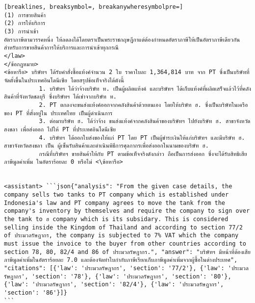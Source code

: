 \begin{Verbatim}[breaklines, breaksymbol=, breakanywheresymbolpre=]
(1) การขายสินค้า
(2) การให้บริการ
(3) การนำเข้า
อัตราภาษีตามวรรคหนึ่ง ให้ลดลงได้โดยตราเป็นพระราชกฤษฎีกาแต่ต้องกำหนดอัตราภาษีให้เป็นอัตราภาษีเดียวกันสำหรับการขายสินค้าการให้บริการและการนำเข้าทุกกรณี
</law>
</ข้อกฎหมาย>
<ข้อหารือ> บริษัทฯ ได้รับคำสั่งซื้อแท้งค์จำนวน 2 ใบ ราคาใบละ 1,364,814 บาท จาก PT ซึ่งเป็นบริษัทที่จัดตั้งขึ้นในประเทศอินโดนีเซีย โดยสรุปข้อเท็จจริงได้ดังนี้
          1. บริษัทฯ ได้ว่าจ้างบริษัท ท. เป็นผู้ผลิตแท้งค์ และบริษัทฯ ได้เก็บแท้งค์ที่ผลิตเสร็จแล้วไว้ที่คลังสินค้าที่จังหวัดชลบุรี ซึ่งบริษัทฯ ได้เช่าจากบริษัท ท.
          2. PT ตกลงจะขนส่งแท้งค์ออกจากคลังสินค้าด้วยตนเอง โดยให้บริษัท ฮ. ซึ่งเป็นบริษัทในเครือของ PT ที่ตั้งอยู่ใน ประเทศไทย เป็นผู้ดำเนินการ
          3. ต่อมาบริษัท ฮ. ได้ว่าจ้าง ขนส่งแท้งค์จากคลังสินค้าของบริษัทฯ ไปยังบริษัท ฮ. สาขาจังหวัดสงขลา เพื่อส่งออก ไปให้ PT ที่ประเทศอินโดนีเซีย
          4. บริษัทฯ ได้ออกใบส่งของให้แก่ PT โดย PT เป็นผู้ชำระเงินให้แก่บริษัทฯ และมีบริษัท ฮ. สาขาจังหวัดสงขลา เป็น ผู้เซ็นรับสินค้าและดำเนินพิธีการศุลกากรเพื่อส่งออกในนามของบริษัท ฮ.
          กรณีที่บริษัทฯ ขายสินค้าให้กับ PT ตามข้อเท็จจริงดังกล่าว ถือเป็นการส่งออก ซึ่งจะได้รับสิทธิเสียภาษีมูลค่าเพิ่ม ในอัตราร้อยละ 0 หรือไม่ <\ข้อหารือ>


<assistant> ```json{"analysis": "From the given case details, the company sells two tanks to PT company which is established under Indonesia's law and PT company agrees to move the tank from the company's inventory by themselves and require the company to sign over the tank to ฮ company which is its subsidary. This is considered selling inside the Kingdom of Thailand and according to section 77/2 of ประมวลรัษฎากร, the company is subjected to 7% VAT which the company must issue the invoice to the buyer from other countries according to section 78, 80, 82/4 and 86 of ประมวลรัษฎากร.", "answer": "บริษัทฯ มีหน้าที่ต้องเสียภาษีมูลค่าเพิ่มในอัตราร้อยละ 7.0 และต้องจัดทำใบกำกับภาษีเรียกเก็บภาษีมูลค่าเพิ่มจากผู้ซื้อในต่างประเทศ", 
"citations": [{'law': 'ประมวลรัษฎากร', 'section': '77/2'}, {'law': 'ประมวลรัษฎากร', 'section': '78'}, {'law': 'ประมวลรัษฎากร', 'section': '80'}, {'law': 'ประมวลรัษฎากร', 'section': '82/4'}, {'law': 'ประมวลรัษฎากร', 'section': '86'}]}
```

\end{Verbatim}

